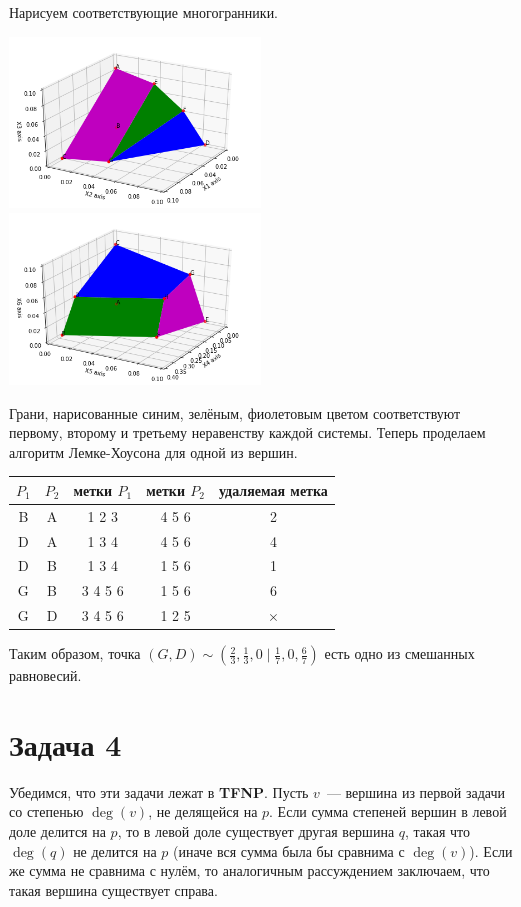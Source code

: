 \documentclass{article}
\theoremstyle{definition}
\theoremstyle{remark}
\begin{document}
Нарисуем соответствующие многогранники.

\includegraphics[width=0.5\textwidth]{pic1}
\includegraphics[width=0.5\textwidth]{pic2}

Грани, нарисованные синим, зелёным, фиолетовым цветом соответствуют первому, второму и третьему
неравенству каждой системы. Теперь проделаем алгоритм Лемке-Хоусона для одной из вершин.

\begin{center}
	\begin{tabular}{|c|c|c|c|c|}
		\hline
		$P_1$ & $P_2$ & метки $P_1$ & метки $P_2$ & удаляемая метка \\
		\hline
		B & A & 1 2 3 & 4 5 6 & 2\\
		\hline
		D & A & 1 3 4 & 4 5 6 & 4\\
		\hline
		D & B & 1 3 4 & 1 5 6 & 1\\
		\hline
		G & B & 3 4 5 6 & 1 5 6 & 6\\
		\hline
		G & D & 3 4 5 6 & 1 2 5 & $\times$\\
		\hline
	\end{tabular}
\end{center}

Таким образом, точка $(G, D) \sim (\frac{2}{3}, \frac{1}{3}, 0 \mid \frac{1}{7}, 0, \frac{6}{7})$
есть одно из смешанных равновесий.

\section*{Задача 4}

Убедимся, что эти задачи лежат в \textbf{TFNP}. Пусть $v$~--- вершина из первой задачи со степенью
$\deg(v)$, не делящейся на $p$. Если сумма степеней вершин в левой доле делится на $p$, то в левой
доле существует другая вершина $q$, такая что $\deg(q)$ не делится на $p$ (иначе вся сумма была бы
сравнима с $\deg(v)$). Если же сумма не сравнима с нулём, то аналогичным рассуждением заключаем, что
такая вершина существует справа.
\end{document}
